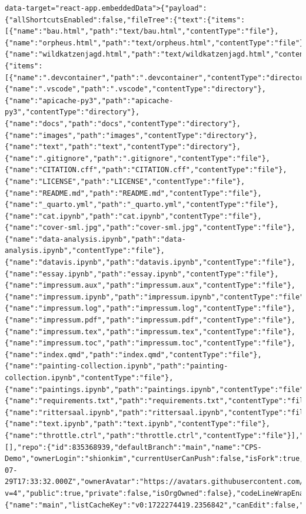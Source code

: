 \documentclass[
  letterpaper,
]{book}
\begin{document}
\begin{verbatim}
data-target="react-app.embeddedData">{"payload":{"allShortcutsEnabled":false,"fileTree":{"text":{"items":[{"name":"bau.html","path":"text/bau.html","contentType":"file"},{"name":"orpheus.html","path":"text/orpheus.html","contentType":"file"},{"name":"wildkatzenjagd.html","path":"text/wildkatzenjagd.html","contentType":"file"}],"totalCount":3},"":{"items":[{"name":".devcontainer","path":".devcontainer","contentType":"directory"},{"name":".vscode","path":".vscode","contentType":"directory"},{"name":"apicache-py3","path":"apicache-py3","contentType":"directory"},{"name":"docs","path":"docs","contentType":"directory"},{"name":"images","path":"images","contentType":"directory"},{"name":"text","path":"text","contentType":"directory"},{"name":".gitignore","path":".gitignore","contentType":"file"},{"name":"CITATION.cff","path":"CITATION.cff","contentType":"file"},{"name":"LICENSE","path":"LICENSE","contentType":"file"},{"name":"README.md","path":"README.md","contentType":"file"},{"name":"_quarto.yml","path":"_quarto.yml","contentType":"file"},{"name":"cat.ipynb","path":"cat.ipynb","contentType":"file"},{"name":"cover-sml.jpg","path":"cover-sml.jpg","contentType":"file"},{"name":"data-analysis.ipynb","path":"data-analysis.ipynb","contentType":"file"},{"name":"datavis.ipynb","path":"datavis.ipynb","contentType":"file"},{"name":"essay.ipynb","path":"essay.ipynb","contentType":"file"},{"name":"impressum.aux","path":"impressum.aux","contentType":"file"},{"name":"impressum.ipynb","path":"impressum.ipynb","contentType":"file"},{"name":"impressum.log","path":"impressum.log","contentType":"file"},{"name":"impressum.pdf","path":"impressum.pdf","contentType":"file"},{"name":"impressum.tex","path":"impressum.tex","contentType":"file"},{"name":"impressum.toc","path":"impressum.toc","contentType":"file"},{"name":"index.qmd","path":"index.qmd","contentType":"file"},{"name":"painting-collection.ipynb","path":"painting-collection.ipynb","contentType":"file"},{"name":"paintings.ipynb","path":"paintings.ipynb","contentType":"file"},{"name":"requirements.txt","path":"requirements.txt","contentType":"file"},{"name":"rittersaal.ipynb","path":"rittersaal.ipynb","contentType":"file"},{"name":"text.ipynb","path":"text.ipynb","contentType":"file"},{"name":"throttle.ctrl","path":"throttle.ctrl","contentType":"file"}],"totalCount":29}},"fileTreeProcessingTime":4.2959950000000005,"foldersToFetch":[],"repo":{"id":835368939,"defaultBranch":"main","name":"CPS-Demo","ownerLogin":"shionkim","currentUserCanPush":false,"isFork":true,"isEmpty":false,"createdAt":"2024-07-29T17:33:32.000Z","ownerAvatar":"https://avatars.githubusercontent.com/u/73858350?v=4","public":true,"private":false,"isOrgOwned":false},"codeLineWrapEnabled":false,"symbolsExpanded":false,"treeExpanded":true,"refInfo":{"name":"main","listCacheKey":"v0:1722274419.2356842","canEdit":false,"refType":"branch"
\end{verbatim}
\end{document}
